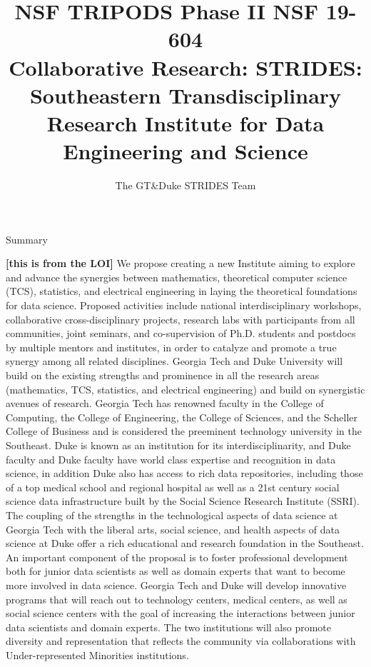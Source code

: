 \documentclass[12pt]{article}
\title{\bf NSF TRIPODS Phase II NSF 19-604  \\
\vspace*{0.5in}
Collaborative Research: STRIDES: Southeastern Transdisciplinary Research Institute for Data Engineering and Science
}
\author{The GT\&Duke STRIDES Team}
\newcommand{\shrink}{\def\baselinestretch{0.90}\large\normalsize}
\begin{document}

\maketitle

\clearpage
\pagestyle{plain}
\normalbaselineskip=10.0pt

\newcommand{\myspace}{1.3}
\baselineskip=\myspace\normalbaselineskip

\begin{center}
Summary
\end{center}

{\bf [this is from the LOI]}
We propose creating a new Institute aiming to explore and advance the synergies between mathematics, theoretical computer science (TCS), statistics, and electrical engineering in laying the theoretical foundations for data science. Proposed activities include national interdisciplinary workshops, collaborative cross-disciplinary projects, research labs with participants from all communities, joint seminars, and co-supervision of Ph.D. students and postdocs by multiple mentors and institutes, in order to catalyze and promote a true synergy among all related disciplines. Georgia Tech and Duke University will build on the existing strengths and prominence in all the research areas (mathematics, TCS, statistics, and electrical engineering) and build on synergistic avenues of research. Georgia Tech has renowned faculty in the College of Computing, the College of Engineering, the College of Sciences, and the Scheller College of Business and is considered the preeminent technology university in the Southeast. Duke is known as an institution for its interdisciplinarity, and Duke faculty and Duke faculty have world class expertise and recognition in data science, in addition Duke also has access to rich data repositories, including those of a top medical school and regional hospital as well as a 21st century social science data infrastructure built by the Social Science Research Institute (SSRI). The coupling of the strengths in the technological aspects of data science at Georgia Tech with the liberal arts, social science, and health aspects of data science at Duke offer a rich educational and research foundation in the Southeast. An important component of the proposal is to foster professional development both for junior data scientists as well as domain experts that want to become more involved in data science. Georgia Tech and Duke will develop innovative programs that will reach out to technology
centers, medical centers, as well as social science centers with the goal of increasing the interactions between junior data scientists and domain experts. The two institutions will also promote diversity and representation that reflects the community via collaborations with Under-represented Minorities institutions.
\end{document}
